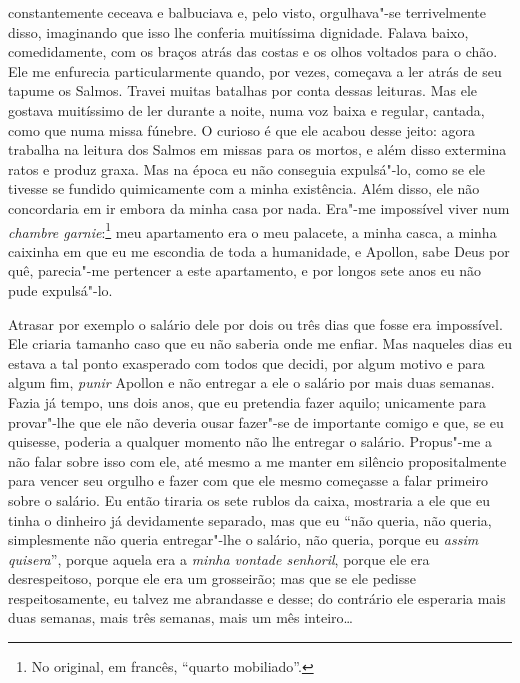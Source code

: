 constantemente ceceava e balbuciava e, pelo visto, orgulhava"-se
terrivelmente disso, imaginando que isso lhe conferia muitíssima
dignidade. Falava baixo, comedidamente, com os braços atrás das costas
e os olhos voltados para o chão. Ele me enfurecia particularmente
quando, por vezes, começava a ler atrás de seu tapume os Salmos. Travei
muitas batalhas por conta dessas leituras. Mas ele gostava muitíssimo
de ler durante a noite, numa voz baixa e regular, cantada, como que
numa missa fúnebre. O curioso é que ele acabou desse jeito: agora
trabalha na leitura dos Salmos em missas para os mortos, e além disso
extermina ratos e produz graxa. Mas na época eu não conseguia
expulsá"-lo, como se ele tivesse se fundido quimicamente com a minha
existência. Além disso, ele não concordaria em ir embora da minha casa
por nada. Era"-me impossível viver num \textit{chambre
garnie}:\footnote{ No original, em francês, ``quarto
mobiliado''.} meu apartamento era o meu palacete, a minha casca, a minha
caixinha em que eu me escondia de toda a humanidade, e Apollon, sabe
Deus por quê, parecia"-me pertencer a este apartamento, e por longos
sete anos eu não pude expulsá"-lo.

Atrasar por exemplo o salário dele por dois ou três dias que fosse era
impossível. Ele criaria tamanho caso que eu não saberia onde me enfiar.
Mas naqueles dias eu estava a tal ponto exasperado com todos que
decidi, por algum motivo e para algum fim, \textit{punir} Apollon e não
entregar a ele o salário por mais duas semanas. Fazia já tempo, uns
dois anos, que eu pretendia fazer aquilo; unicamente para provar"-lhe
que ele não deveria ousar fazer"-se de importante comigo e que, se eu
quisesse, poderia a qualquer momento não lhe entregar o salário.
Propus"-me a não falar sobre isso com ele, até mesmo a me manter em
silêncio propositalmente para vencer seu orgulho e fazer com que ele
mesmo começasse a falar primeiro sobre o salário. Eu então tiraria os
sete rublos da caixa, mostraria a ele que eu tinha o dinheiro já
devidamente separado, mas que eu ``não queria, não queria, simplesmente
não queria entregar"-lhe o salário, não queria, porque eu
\textit{assim quisera}'', porque aquela era a \textit{minha
vontade senhoril}, porque ele era desrespeitoso, porque ele era um
grosseirão; mas que se ele pedisse respeitosamente, eu talvez me
abrandasse e desse; do contrário ele esperaria mais duas semanas, mais
três semanas, mais um mês inteiro\ldots{}

